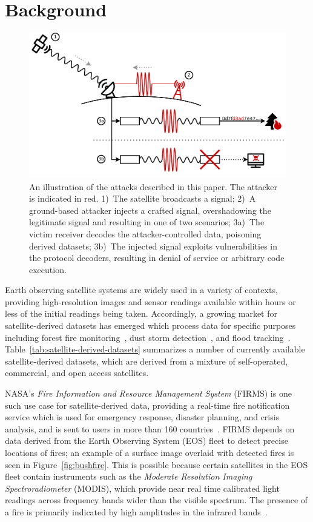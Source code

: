 \section{Background}\label{sec:background}
\begin{figure}
    \centering
    \includegraphics[width=\columnwidth]{diagrams/attack_illustration.pdf}
    \caption{An illustration of the attacks described in this paper. The attacker is indicated in red. 1)~The satellite broadcasts a signal; 2)~A ground-based attacker injects a crafted signal, overshadowing the legitimate signal and resulting in one of two scenarios; 3a)~The victim receiver decodes the attacker-controlled data, poisoning derived datasets; 3b)~The injected signal exploits vulnerabilities in the protocol decoders, resulting in denial of service or arbitrary code execution.}
    \label{fig:attack-illustration}
\end{figure}

Earth observing satellite systems are widely used in a variety of contexts, providing high-resolution images and sensor readings available within hours or less of the initial readings being taken.
Accordingly, a growing market for satellite-derived datasets has emerged which process data for specific purposes including forest fire monitoring~\cite{nasaFirms}, dust storm detection~\cite{sarikhani2021new}, and flood tracking~\cite{cloudToStreet}.
Table~\ref{tab:satellite-derived-datasets} summarizes a number of currently available satellite-derived datasets, which are derived from a mixture of self-operated, commercial, and open access satellites.

NASA's \textit{Fire Information and Resource Management System} (FIRMS) is one such use case for satellite-derived data, providing a real-time fire notification service which is used for emergency response, disaster planning, and crisis analysis, and is sent to users in more than 160 countries~\cite{firmsUsage}.
FIRMS depends on data derived from the Earth Observing System (EOS) fleet to detect precise locations of fires; an example of a surface image overlaid with detected fires is seen in Figure~\ref{fig:bushfire}.
This is possible because certain satellites in the EOS fleet contain instruments such as the \textit{Moderate Resolution Imaging Spectroradiometer} (MODIS), which provide near real time calibrated light readings across frequency bands wider than the visible spectrum.
The presence of a fire is primarily indicated by high amplitudes in the infrared bands~\cite{mod14Manual}.

